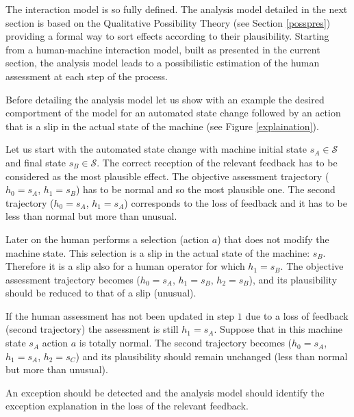 The interaction model is so fully defined.
The analysis model detailed in the next section is based on the Qualitative Possibility Theory (see Section \ref{posspres}) 
providing a formal way to sort effects according to their plausibility. 
Starting from a human-machine interaction model, built as presented in the current section, 
the analysis model leads to a possibilistic estimation of the human assessment at each step of the process.

Before detailing the analysis model let us show with an example the desired comportment of the model for an automated state change followed by an action that is a slip in the actual state of the machine (see Figure \ref{explaination}).

Let us start with the automated state change with machine initial state $s_A \in \mathcal{S}$  
and final state $s_B \in \mathcal{S}$. 
The correct reception of the relevant feedback 
has to be considered as the most plausible effect. 
The objective assessment trajectory ($h_0=s_A$, $h_1=s_B$) 
has to be normal and so the most plausible one. 
The second trajectory ($h_0=s_A$, $h_1=s_A$) 
corresponds to the loss of feedback 
and it has to be less than normal but more than unusual.

Later on the human performs a selection (action $a$) 
that does not modify the machine state. 
This selection is a slip in the actual state of the machine: $s_B$. 
Therefore it is a slip also for a human operator for which $h_1=s_B$. 
The objective assessment trajectory becomes ($h_0=s_A$, $h_1=s_B$, $h_2=s_B$), 
and its plausibility should be reduced to that of a slip (unusual).

If the human assessment has not been updated in step $1$ due to a loss of feedback (second trajectory) 
the assessment is still $h_1=s_A$. 
Suppose that in this machine state $s_A$ action $a$ is totally normal. 
The second trajectory becomes ($h_0=s_A$, $h_1=s_A$, $h_2=s_C$) and its plausibility should remain unchanged (less than normal but more than unusual).

An exception should be detected and the analysis model should identify the exception explanation in the loss of the 
relevant feedback.


